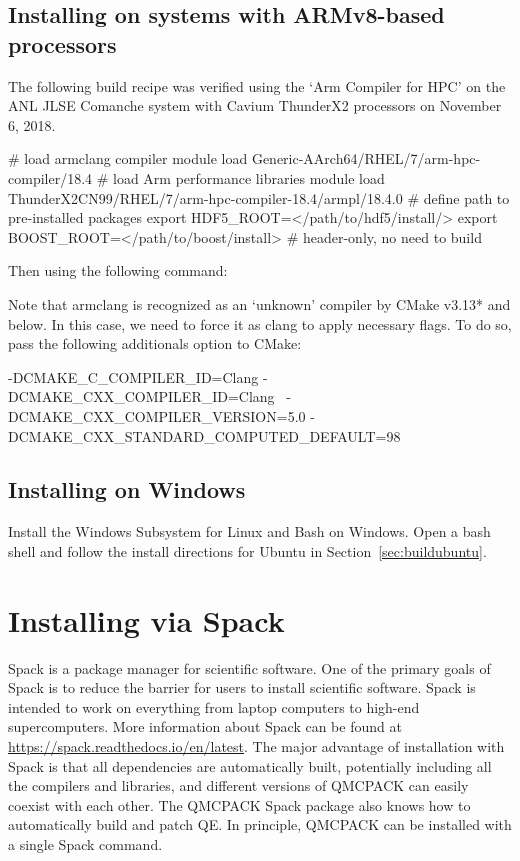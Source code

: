 \subsection{Installing on systems with ARMv8-based processors}
The following build recipe was verified using the `Arm Compiler for HPC' on the ANL JLSE Comanche system with Cavium ThunderX2 processors on November 6, 2018.
\begin{shade}
# load armclang compiler
module load Generic-AArch64/RHEL/7/arm-hpc-compiler/18.4
# load Arm performance libraries
module load ThunderX2CN99/RHEL/7/arm-hpc-compiler-18.4/armpl/18.4.0
# define path to pre-installed packages
export HDF5_ROOT=</path/to/hdf5/install/>
export BOOST_ROOT=</path/to/boost/install> # header-only, no need to build
\end{shade}
Then using the following command:
Note that armclang is recognized as an `unknown' compiler by CMake v3.13* and below. In this case, we need to force it as clang to apply necessary flags. To do so, pass the following additionals option to CMake:
\begin{shade}
      -DCMAKE_C_COMPILER_ID=Clang -DCMAKE_CXX_COMPILER_ID=Clang \
      -DCMAKE_CXX_COMPILER_VERSION=5.0 -DCMAKE_CXX_STANDARD_COMPUTED_DEFAULT=98 \
\end{shade}      

\subsection{Installing on Windows}
Install the Windows Subsystem for Linux and Bash on Windows.
Open a bash shell and follow the install directions for Ubuntu in Section~\ref{sec:buildubuntu}.

\section{Installing via Spack}
Spack is a package manager for scientific software.
One of the primary goals of Spack is to reduce the barrier for users to install scientific
software. Spack is intended to work on everything from laptop
computers to high-end supercomputers. More information about Spack can
be found at \url{https://spack.readthedocs.io/en/latest}. The major
advantage of installation with Spack is that all dependencies are
automatically built, potentially including all the compilers and libraries, and
different versions of QMCPACK can easily coexist with each other.
The QMCPACK Spack package also knows how to automatically build
and patch QE. In principle, QMCPACK can be installed with
a single Spack command.

